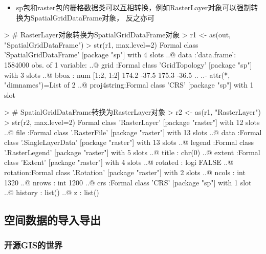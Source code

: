 \begin{frame}[t,fragile]{\subsecname}{\subsubsecname}
\begin{itemize}
\item<1-> sp包和raster包的栅格数据类可以互相转换，例如RasterLayer对象可以强制转换为SpatialGridDataFrame对象，
反之亦可
\end{itemize}

\begin{rcode}
> # RasterLayer对象转换为SpatialGridDataFrame对象
> r1 <- as(out, "SpatialGridDataFrame")
> str(r1, max.level=2)
Formal class 'SpatialGridDataFrame' [package "sp"] with 4 slots
  ..@ data       :'data.frame': 1584000 obs. of  1 variable:
  ..@ grid       :Formal class 'GridTopology' [package "sp"] with 3 slots
  ..@ bbox       : num [1:2, 1:2] 174.2 -37.5 175.3 -36.5
  .. ..- attr(*, "dimnames")=List of 2
  ..@ proj4string:Formal class 'CRS' [package "sp"] with 1 slot

> # SpatialGridDataFrame转换为RasterLayer对象
> r2 <- as(r1, "RasterLayer")
> str(r2, max.level=2)
Formal class 'RasterLayer' [package "raster"] with 12 slots
  ..@ file    :Formal class '.RasterFile' [package "raster"] with 13 slots
  ..@ data    :Formal class '.SingleLayerData' [package "raster"] with 13 slots
  ..@ legend  :Formal class '.RasterLegend' [package "raster"] with 5 slots
  ..@ title   : chr(0) 
  ..@ extent  :Formal class 'Extent' [package "raster"] with 4 slots
  ..@ rotated : logi FALSE
  ..@ rotation:Formal class '.Rotation' [package "raster"] with 2 slots
  ..@ ncols   : int 1320
  ..@ nrows   : int 1200
  ..@ crs     :Formal class 'CRS' [package "sp"] with 1 slot
  ..@ history : list()
  ..@ z       : list()
\end{rcode}
\end{frame}

\subsection{空间数据的导入导出}
\subsubsection{开源GIS的世界}

